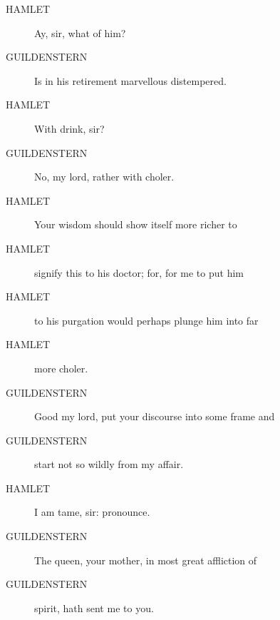 \documentclass{article}
\begin{document}
\begin{description}
            
\item[HAMLET] Ay, sir, what of him?
\end{description}
          
\begin{description}
            
\item[GUILDENSTERN] Is in his retirement marvellous distempered.
\end{description}
          
\begin{description}
            
\item[HAMLET] With drink, sir?
\end{description}
          
\begin{description}
            
\item[GUILDENSTERN] No, my lord, rather with choler.
\end{description}
          
\begin{description}
            
\item[HAMLET] Your wisdom should show itself more richer to
\item[HAMLET] signify this to his doctor; for, for me to put him
\item[HAMLET] to his purgation would perhaps plunge him into far
\item[HAMLET] more choler.
\end{description}
          
\begin{description}
            
\item[GUILDENSTERN] Good my lord, put your discourse into some frame and
\item[GUILDENSTERN] start not so wildly from my affair.
\end{description}
          
\begin{description}
            
\item[HAMLET] I am tame, sir: pronounce.
\end{description}
          
\begin{description}
            
\item[GUILDENSTERN] The queen, your mother, in most great affliction of
\item[GUILDENSTERN] spirit, hath sent me to you.
\end{description}
          
\end{document}
